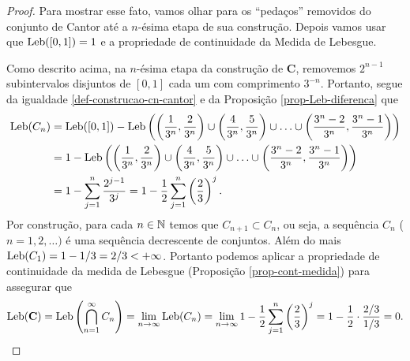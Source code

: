         \begin{proof}
            Para mostrar esse fato, vamos olhar para os ``pedaços'' removidos do conjunto de
            Cantor até a $n$-ésima etapa de sua construção. Depois vamos usar que $\mathrm{Leb}([0,1]) = 1$ e a propriedade de
            continuidade da Medida de Lebesgue.
            
            Como descrito acima, na $n$-ésima etapa da 
            construção de 
            $\mathbf{C}$, removemos $2^{n-1}$ 
            subintervalos disjuntos de $[0,1]$ 
            cada um com comprimento $3^{-n}$. Portanto,
            segue da igualdade \eqref{def-construcao-cn-cantor} 
            e da Proposição \ref{prop-Leb-diferenca} que
            \begin{align*}
                \mathrm{Leb}(C_n)
                &=
                \mathrm{Leb}([0,1])
                -
                \mathrm{Leb}
                \left( 
                    \left( \frac{1}{3^n}, \frac{2}{3^n} \right) \cup
                    \left( \frac{4}{3^n}, \frac{5}{3^n} \right) \cup\ldots\cup
                    \left( \frac{3^n-2}{3^n},\frac{3^n-1}{3^n} \right)
                \right)
                \\
                &=
                1
                -
                \mathrm{Leb}
                \left( 
                    \left( \frac{1}{3^n},\frac{2}{3^n} \right) \cup
                    \left( \frac{4}{3^n},\frac{5}{3^n} \right) \cup\ldots\cup
                    \left( \frac{3^n-2}{3^n},\frac{3^n-1}{3^n} \right)
                \right)
                \\
                &=
                1-\sum_{j=1}^n \frac{2^{j-1}}{3^j}
                =
                1-\frac{1}{2}\sum_{j=1}^n \left(\frac{2}{3}\right)^j.
            \end{align*}
            Por construção, para cada $n\in\mathbb{N}$ 
            temos que $C_{n+1}\subset C_n$, ou seja, 
            a sequência $C_n$ ($n=1,2,\ldots)$ é uma 
            sequência decrescente de conjuntos. Além do mais 
            $\mathrm{Leb}(C_1) = 1-1/3 = 2/3 < +\infty$. Portanto 
            podemos aplicar a propriedade de continuidade 
            da medida de Lebesgue 
            (Proposição \ref{prop-cont-medida})
            para assegurar que 
            \[
                \mathrm{Leb}(\mathbf{C} )
                =
                \mathrm{Leb}\left(\bigcap_{n=1}^{\infty} C_n \right)
                =
                \lim_{n\to\infty} \mathrm{Leb}(C_n)
                =
                \lim_{n\to\infty} 1-\frac{1}{2}\sum_{j=1}^n \left(\frac{2}{3}\right)^j
                =
                1- \frac{1}{2}\cdot\frac{2/3}{1/3} = 0.
            \]
        \end{proof}
